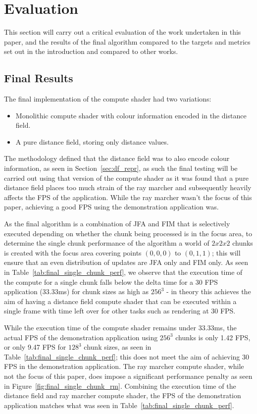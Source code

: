 \chapter{Evaluation}
This section will carry out a critical evaluation of the work undertaken in this paper, and the results of the final
algorithm compared to the targets and metrics set out in the introduction and compared to other works.

\section{Final Results}
The final implementation of the compute shader had two variations:

\begin{itemize}
    \item Monolithic compute shader with colour information encoded in the distance field.
    \item A pure distance field, storing only distance values.
\end{itemize}

The methodology defined that the distance field was to also encode colour information, as seen in
Section~\ref{sec:df_repr}, as such the final testing will be carried out using that version of the compute shader as it
was found that a pure distance field places too much strain of the ray marcher and subsequently heavily affects the FPS
of the application. While the ray marcher wasn't the focus of this paper, achieving a good FPS using the demonstration
application was.

As the final algorithm is a combination of JFA and FIM that is selectively executed depending on whether the chunk being
processed is in the focus area, to determine the single chunk performance of the algorithm a world of $2x2x2$ chunks is
created with the focus area covering points $(0, 0, 0)$ to $(0, 1, 1)$; this will ensure that an even distribution of
updates are JFA only and FIM only. As seen in Table~\ref{tab:final_single_chunk_perf}, we observe that the execution
time of the compute for a single chunk falls below the delta time for a 30 FPS application (33.33ms) for chunk sizes
as high as $256^3$ - in theory this achieves the aim of having a distance field compute shader that can be executed
within a single frame with time left over for other tasks such as rendering at 30 FPS.

While the execution time of the compute shader remains under 33.33ms, the actual FPS of the demonstration application
using $256^3$ chunks is only 1.42 FPS, or only 9.47 FPS for $128^3$ chunk sizes, as seen in
Table~\ref{tab:final_single_chunk_perf}; this does not meet the aim of achieving 30 FPS in the demonstration
application. The ray marcher compute shader, while not the focus of this paper, does impose a significant performance
penalty as seen in Figure~\ref{fig:final_single_chunk_rm}. Combining the execution time of the distance field and ray
marcher compute shader, the FPS of the demonstration application matches what was seen in
Table~\ref{tab:final_single_chunk_perf}.

